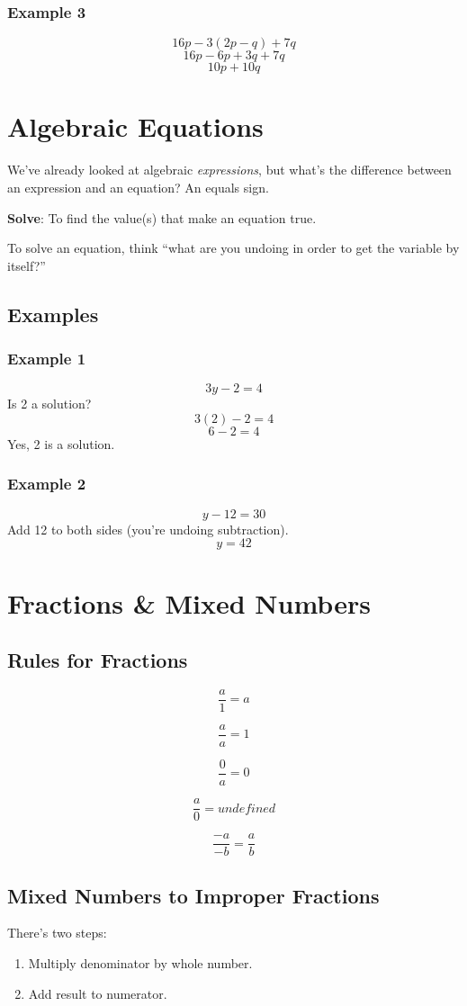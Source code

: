 \documentclass[letterpaper, 10pt]{article}
\begin{document}
\subsubsection{Example 3}
$$16p - 3 (2p - q) + 7q$$
$$16p - 6p + 3q + 7q$$
$$10p + 10q$$


\section{Algebraic Equations}
We've already looked at algebraic \textit{expressions}, but what's the difference between an expression and an equation? An equals sign. 

\textbf{Solve}: To find the value(s) that make an equation true.

To solve an equation, think ``what are you undoing in order to get the variable by itself?''

\subsection{Examples}
\subsubsection{Example 1}
	$$3y - 2 = 4$$
	Is 2 a solution? 
	$$3(2) - 2 = 4$$
	$$6 - 2 = 4$$
	Yes, 2 is a solution.


\subsubsection{Example 2}
$$y - 12 = 30$$
Add 12 to both sides (you're undoing subtraction).
$$y = 42$$

\section{Fractions \& Mixed Numbers}
\subsection{Rules for Fractions}
$$
\frac{a}{1} = a
$$

$$
\frac{a}{a} = 1
$$

$$
\frac{0}{a} = 0
$$

$$ 
\frac{a}{0} = undefined
$$

$$
\frac{-a}{-b} = \frac{a}{b}
$$

\subsection{Mixed Numbers to Improper Fractions}
There's two steps: 
\begin{enumerate}
\item Multiply denominator by whole number.
\item Add result to numerator.
\end{enumerate}
\end{document}
